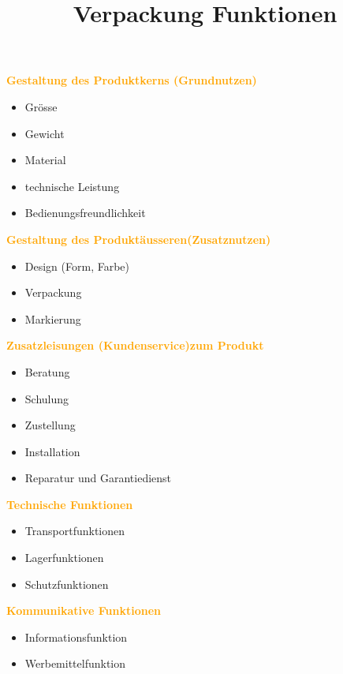 \documentclass[../ZF_Wing.tex]{subfiles}
\begin{document}
\begin{multicols}{3}
\textcolor {orange} {\textbf{Gestaltung des Produktkerns (Grundnutzen)}}
\begin{itemize}
	\item Grösse
	\item Gewicht
	\item Material
	\item technische Leistung
	\item Bedienungsfreundlichkeit
\end{itemize}


\columnbreak
\textcolor {orange} {\textbf{Gestaltung des Produktäusseren(Zusatznutzen)}}
\begin{itemize}
	\item Design (Form, Farbe)
	\item Verpackung
	\item Markierung
\end{itemize}

\columnbreak
\textcolor {orange} {\textbf{Zusatzleisungen (Kundenservice)zum Produkt}}
\begin{itemize}
	\item Beratung
	\item Schulung
	\item Zustellung
	\item Installation
	\item Reparatur und Garantiedienst
\end{itemize}




\end{multicols}


\title{Verpackung Funktionen}

\begin{multicols}{2}
\textcolor {orange} {\textbf{Technische Funktionen}}
\begin{itemize}
	\item Transportfunktionen
	\item Lagerfunktionen
	\item Schutzfunktionen
\end{itemize}


\columnbreak
\textcolor {orange} {\textbf{Kommunikative Funktionen}}

\begin{itemize}
	\item Informationsfunktion
	\item Werbemittelfunktion
	
\end{itemize}

\end{multicols}
\end{document}
